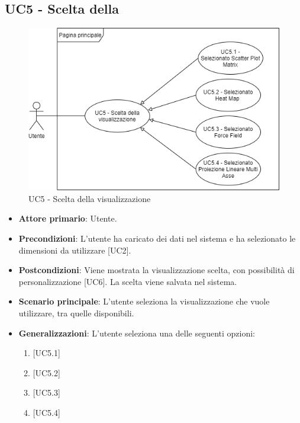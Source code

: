 \subsection{UC5 - Scelta della }
\begin{figure}[h]
\includegraphics[width=\linewidth]{../Images/UC5.png}
\centering
\caption{UC5 - Scelta della visualizzazione}
\end{figure}
\begin{itemize}
	\item \textbf{Attore primario}: Utente.
	\item \textbf{Precondizioni}: L'utente ha caricato dei dati nel sistema e ha selezionato le dimensioni da utilizzare [UC2].
	\item \textbf{Postcondizioni}: Viene mostrata la visualizzazione scelta, con possibilità di personalizzazione [UC6]. La scelta viene salvata nel sistema.
	\item \textbf{Scenario principale}: L'utente seleziona la visualizzazione che vuole utilizzare, tra quelle disponibili.
	\item \textbf{Generalizzazioni}: L'utente seleziona una delle seguenti opzioni:
		\begin{enumerate}
			\item {}
			\item {}
			\item {}
			\item {}
		\end{enumerate}

\end{itemize}